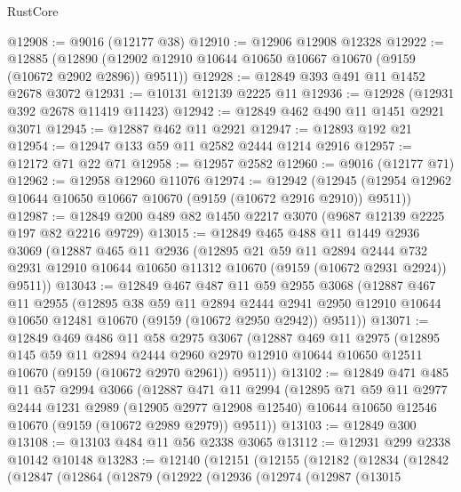 \begin{lexlean}{RustCore}
\begin{coremodule}
@12908 := @9016 (@12177 @38)
@12910 := @12906 @12908 @12328
@12922 := @12885
    (@12890 (@12902 @12910 @10644 @10650 @10667 @10670 (@9159 (@10672 @2902 @2896)) @9511))
@12928 := @12849 @393 @491 @11 @1452 @2678 @3072
@12931 := @10131 @12139 @2225 @11
@12936 := @12928 (@12931 @392 @2678 @11419 @11423)
@12942 := @12849 @462 @490 @11 @1451 @2921 @3071
@12945 := @12887 @462 @11 @2921
@12947 := @12893 @192 @21
@12954 := @12947 @133 @59 @11 @2582 @2444 @1214 @2916
@12957 := @12172 @71 @22 @71
@12958 := @12957 @2582
@12960 := @9016 (@12177 @71)
@12962 := @12958 @12960 @11076
@12974 := @12942
    (@12945 (@12954 @12962 @10644 @10650 @10667 @10670 (@9159 (@10672 @2916 @2910)) @9511))
@12987 := @12849 @200 @489 @82 @1450 @2217 @3070 (@9687 @12139 @2225 @197 @82 @2216 @9729)
@13015 := @12849
    @465
    @488
    @11
    @1449
    @2936
    @3069
    (@12887
      @465
      @11
      @2936
      (@12895
        @21
        @59
        @11
        @2894
        @2444
        @732
        @2931
        @12910
        @10644
        @10650
        @11312
        @10670
        (@9159 (@10672 @2931 @2924))
        @9511))
@13043 := @12849
    @467
    @487
    @11
    @59
    @2955
    @3068
    (@12887
      @467
      @11
      @2955
      (@12895
        @38
        @59
        @11
        @2894
        @2444
        @2941
        @2950
        @12910
        @10644
        @10650
        @12481
        @10670
        (@9159 (@10672 @2950 @2942))
        @9511))
@13071 := @12849
    @469
    @486
    @11
    @58
    @2975
    @3067
    (@12887
      @469
      @11
      @2975
      (@12895
        @145
        @59
        @11
        @2894
        @2444
        @2960
        @2970
        @12910
        @10644
        @10650
        @12511
        @10670
        (@9159 (@10672 @2970 @2961))
        @9511))
@13102 := @12849
    @471
    @485
    @11
    @57
    @2994
    @3066
    (@12887
      @471
      @11
      @2994
      (@12895
        @71
        @59
        @11
        @2977
        @2444
        @1231
        @2989
        (@12905 @2977 @12908 @12540)
        @10644
        @10650
        @12546
        @10670
        (@9159 (@10672 @2989 @2979))
        @9511))
@13103 := @12849 @300
@13108 := @13103 @484 @11 @56 @2338 @3065
@13112 := @12931 @299 @2338 @10142 @10148
@13283 := @12140
    (@12151
      (@12155
        (@12182
          (@12834
            (@12842
              (@12847
                (@12864
                  (@12879
                    (@12922
                      (@12936
                        (@12974
                          (@12987
                            (@13015

\end{coremodule}
\end{lexlean}
